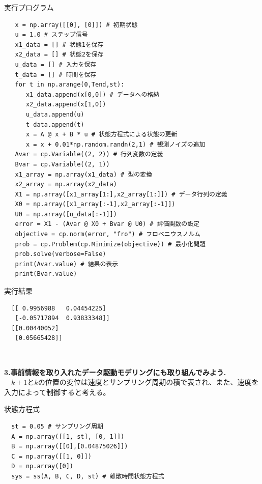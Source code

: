 \documentclass[a4paper,10.5pt]{ltjsarticle}
\begin{document}
\centerline{実行プログラム}
\begin{lstlisting}
   x = np.array([[0], [0]]) # 初期状態
   u = 1.0 # ステップ信号
   x1_data = [] # 状態1を保存
   x2_data = [] # 状態2を保存
   u_data = [] # 入力を保存
   t_data = [] # 時間を保存
   for t in np.arange(0,Tend,st):
      x1_data.append(x[0,0]) # データへの格納
      x2_data.append(x[1,0])
      u_data.append(u)
      t_data.append(t)
      x = A @ x + B * u # 状態方程式による状態の更新
      x = x + 0.01*np.random.randn(2,1) # 観測ノイズの追加
   Avar = cp.Variable((2, 2)) # 行列変数の定義
   Bvar = cp.Variable((2, 1))
   x1_array = np.array(x1_data) # 型の変換
   x2_array = np.array(x2_data)
   X1 = np.array([x1_array[1:],x2_array[1:]]) # データ行列の定義
   X0 = np.array([x1_array[:-1],x2_array[:-1]])
   U0 = np.array([u_data[:-1]])
   error = X1 - (Avar @ X0 + Bvar @ U0) # 評価関数の設定
   objective = cp.norm(error, "fro") # フロベニウスノルム
   prob = cp.Problem(cp.Minimize(objective)) # 最小化問題
   prob.solve(verbose=False)
   print(Avar.value) # 結果の表示
   print(Bvar.value)
\end{lstlisting}
\centerline{実行結果}
\begin{lstlisting}
  [[ 0.9956988   0.04454225]
   [-0.05717894  0.93833348]]
  [[0.00440052]
   [0.05665428]]
\end{lstlisting}
\centerline{　}
{\large \bfseries 3.事前情報を取り入れたデータ駆動モデリングにも取り組んでみよう.}\\
　$k+1$と$k$の位置の変位は速度とサンプリング周期の積で表され、また、速度を入力によって制御すると考える。
\centerline{状態方程式}
\begin{lstlisting}
  st = 0.05 # サンプリング周期
  A = np.array([[1, st], [0, 1]])
  B = np.array([[0],[0.04875026]])
  C = np.array([[1, 0]])
  D = np.array([0])
  sys = ss(A, B, C, D, st) # 離散時間状態方程式
\end{lstlisting}
\end{document}
